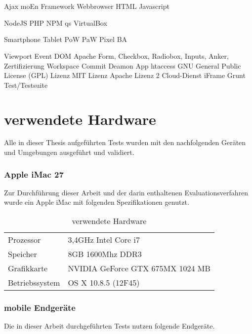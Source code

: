 		\\ \\\Gls{Ajax}
		\Gls{moEn}
		\Gls{Framework}
		\Gls{Webbrowser}
		\Gls{HTML}
		\Gls{Javascript}
		
		\Gls{NodeJS}
		\Gls{PHP}
		\Gls{NPM}
		\Gls{qs}
		\Gls{VirtualBox}
		
		\Gls{Smartphone}
		\Gls{Tablet}
		\Gls{PoW}
		\Gls{PaW}
		\Gls{Pixel}
		\Gls{BA}
		
		\Gls{Viewport}
		\Gls{Event}
		\Gls{DOM}
		\Gls{Apache}
		\Gls{Form, Checkbox, Radiobox, Inputs, Anker, Zertifizierung}
		\Gls{Workspace}
		\Gls{Commit}
		\Gls{Deamon}
		\Gls{App}
		\Gls{htaccess}
		\Gls{GNU General Public License (GPL) Lizenz}
		\Gls{MIT Lizenz}
		\Gls{Apache Lizenz 2}
		\Gls{Cloud-Dienst}
		\Gls{iFrame}
		\Gls{Grunt}
		\Gls{Test/Testsuite}
	
	\pagebreak
	\section{verwendete Hardware}
	Alle in dieser Thesis aufgeführten Tests wurden mit den nachfolgenden Geräten und Umgebungen ausgeführt und validiert.
	
	\subsubsection{Apple iMac 27\texttt\dq}
	Zur Durchführung dieser Arbeit und der darin enthaltenen Evaluationsverfahren wurde ein Apple iMac mit folgenden 				Spezifikationen genutzt.
	
	\begin{table}[H]
	 \vspace{-20pt}
 		\centering
			\begin{tabular}{| p{4cm} | p{8cm}  |}
			\hline
				Prozessor			&	3,4GHz Intel Core i7 \\
				Speicher			&	8GB 1600Mhz DDR3\\
				Grafikkarte		&	NVIDIA GeForce GTX 675MX 1024 MB\\
				Betriebssystem		&	OS X 10.8.5 (12F45)\\

				\hline
				\end{tabular}
			\caption{verwendete Hardware}
	\end{table}

	\subsubsection{mobile Endgeräte}
	Die in dieser Arbeit durchgeführten Tests nutzen folgende Endgeräte. 
	
